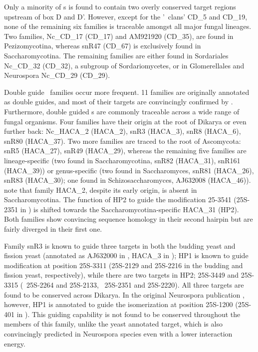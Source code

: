 Only a minority of \cd s is found to contain two overly conserved
target regions upstream of box D and D'. However, except for the '\sno\
clans' CD\_5 and CD\_19, none of the remaining six families is
traceable amongst all major fungal lineages. Two families, Nc\_CD\_17
(CD\_17) and AM921920 (CD\_35), are found in Pezizomycotina, whereas
snR47 (CD\_67) is exclusively found in Saccharomycotina. The remaining
families are either found in Sordariales Nc\_CD\_32 (CD\_32), a
subgroup of Sordariomycetes, or in Glomerellales and Neurospora
Nc\_CD\_29 (CD\_29).

Double guide \haca\ families occur more frequent. 11 families are
originally annotated as double guides, and most of their targets are
convincingly confirmed by \snostrip. Furthermore, double guided \haca s are
commonly traceable across a wide range of fungal organisms. Four families
have their origin at the root of Dikarya or even further back: Nc\_HACA\_2
(HACA\_2), snR3 (HACA\_3), snR8 (HACA\_6), snR80 (HACA\_37). Two more
families are traced to the root of Ascomycota: snR5 (HACA\_27), snR49
(HACA\_29), whereas the remaining five families are lineage-specific (two
found in Saccharomycotina, snR82 (HACA\_31), snR161 (HACA\_39)) or
genus-specific (two found in Saccharomyces, snR81 (HACA\_26), snR83
(HACA\_30); one found in Schizosaccharomyces, AJ632008
(HACA\_46)).  note that family HACA\_2, despite its early origin,
is absent in Saccharomycotina. The function of HP2 to guide the
modification 25-3541 (25S-2351 in \sce) is shifted towards the
Saccharomycotina-specific HACA\_31 (HP2). Both families show convincing
sequence homology in their second hairpin but are fairly diverged in their
first one.

Family snR3 is known \cite{Schattner:2004} to guide three targets in
both the budding yeast and fission yeast (annotated as AJ632000 in
\spo, HACA\_3 in \snostrip); HP1 is known to guide modification at
position 25S-3311 (25S-2129 and 25S-2216 in the budding and fission
yeast, respectively), while there are two targets in HP2; 25S-3449 and
25S-3315 (\sce\ 25S-2264 and 25S-2133, \spo\ 25S-2351 and
25S-2220). All three targets are found to be conserved across
Dikarya. In the original Neurospora publication \cite{Liu:2009},
however, HP1 is annotated to guide the isomerization at position
25S-1200 (25S-401 in \Ncr). This guiding capability is not found to be
conserved throughout the members of this family, unlike the yeast
annotated target, which is also convincingly predicted in Neurospora
species even with a lower interaction energy.

